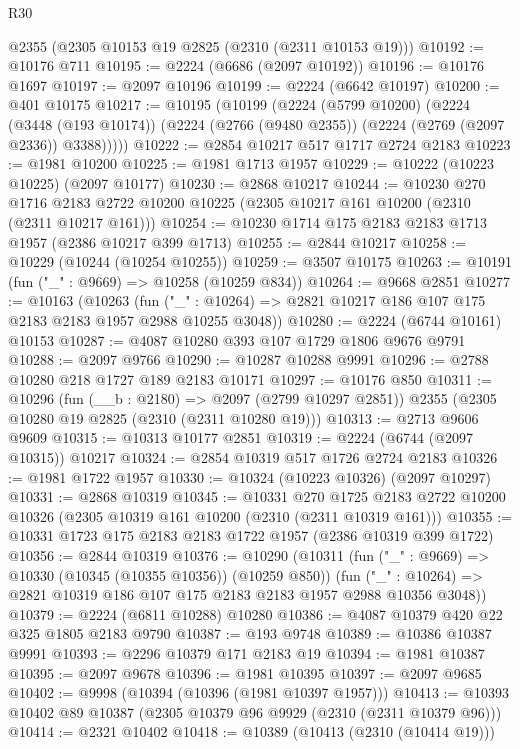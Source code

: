 \begin{lexlean}{R30}
\begin{coremodule}
    @2355
    (@2305 @10153 @19 @2825 (@2310 (@2311 @10153 @19)))
@10192 := @10176 @711
@10195 := @2224 (@6686 (@2097 @10192))
@10196 := @10176 @1697
@10197 := @2097 @10196
@10199 := @2224 (@6642 @10197)
@10200 := @401 @10175
@10217 := @10195
    (@10199
      (@2224
        (@5799 @10200)
        (@2224
          (@3448 (@193 @10174))
          (@2224 (@2766 (@9480 @2355)) (@2224 (@2769 (@2097 @2336)) @3388)))))
@10222 := @2854 @10217 @517 @1717 @2724 @2183
@10223 := @1981 @10200
@10225 := @1981 @1713 @1957
@10229 := @10222 (@10223 @10225) (@2097 @10177)
@10230 := @2868 @10217
@10244 := @10230
    @270
    @1716
    @2183
    @2722
    @10200
    @10225
    (@2305 @10217 @161 @10200 (@2310 (@2311 @10217 @161)))
@10254 := @10230 @1714 @175 @2183 @2183 @1713 @1957 (@2386 @10217 @399 @1713)
@10255 := @2844 @10217
@10258 := @10229 (@10244 (@10254 @10255))
@10259 := @3507 @10175
@10263 := @10191 (fun ("_" : @9669) => @10258 (@10259 @834))
@10264 := @9668 @2851
@10277 := @10163
    (@10263
      (fun ("_" : @10264) => @2821 @10217 @186 @107 @175 @2183 @2183 @1957 @2988 @10255 @3048))
@10280 := @2224 (@6744 @10161) @10153
@10287 := @4087 @10280 @393 @107 @1729 @1806 @9676 @9791
@10288 := @2097 @9766
@10290 := @10287 @10288 @9991
@10296 := @2788 @10280 @218 @1727 @189 @2183 @10171
@10297 := @10176 @850
@10311 := @10296
    (fun (__b : @2180) => @2097 (@2799 @10297 @2851))
    @2355
    (@2305 @10280 @19 @2825 (@2310 (@2311 @10280 @19)))
@10313 := @2713 @9606 @9609
@10315 := @10313 @10177 @2851
@10319 := @2224 (@6744 (@2097 @10315)) @10217
@10324 := @2854 @10319 @517 @1726 @2724 @2183
@10326 := @1981 @1722 @1957
@10330 := @10324 (@10223 @10326) (@2097 @10297)
@10331 := @2868 @10319
@10345 := @10331
    @270
    @1725
    @2183
    @2722
    @10200
    @10326
    (@2305 @10319 @161 @10200 (@2310 (@2311 @10319 @161)))
@10355 := @10331 @1723 @175 @2183 @2183 @1722 @1957 (@2386 @10319 @399 @1722)
@10356 := @2844 @10319
@10376 := @10290
    (@10311
      (fun ("_" : @9669) => @10330 (@10345 (@10355 @10356)) (@10259 @850))
      (fun ("_" : @10264) => @2821 @10319 @186 @107 @175 @2183 @2183 @1957 @2988 @10356 @3048))
@10379 := @2224 (@6811 @10288) @10280
@10386 := @4087 @10379 @420 @22 @325 @1805 @2183 @9790
@10387 := @193 @9748
@10389 := @10386 @10387 @9991
@10393 := @2296 @10379 @171 @2183 @19
@10394 := @1981 @10387
@10395 := @2097 @9678
@10396 := @1981 @10395
@10397 := @2097 @9685
@10402 := @9998 (@10394 (@10396 (@1981 @10397 @1957)))
@10413 := @10393 @10402 @89 @10387 (@2305 @10379 @96 @9929 (@2310 (@2311 @10379 @96)))
@10414 := @2321 @10402
@10418 := @10389 (@10413 (@2310 (@10414 @19)))

\end{coremodule}
\end{lexlean}
